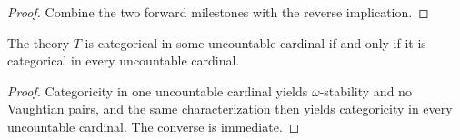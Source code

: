 \begin{proof}
Combine the two forward milestones with the reverse implication.
\end{proof}

\begin{corollary}
\label{cor:morley-categoricity}
The theory \(T\) is categorical in some uncountable cardinal if and only
if it is categorical in every uncountable cardinal.
\end{corollary}

\begin{proof}
Categoricity in one uncountable cardinal yields \(\omega\)-stability and
no Vaughtian pairs, and the same characterization then yields
categoricity in every uncountable cardinal.  The converse is immediate.
\end{proof}